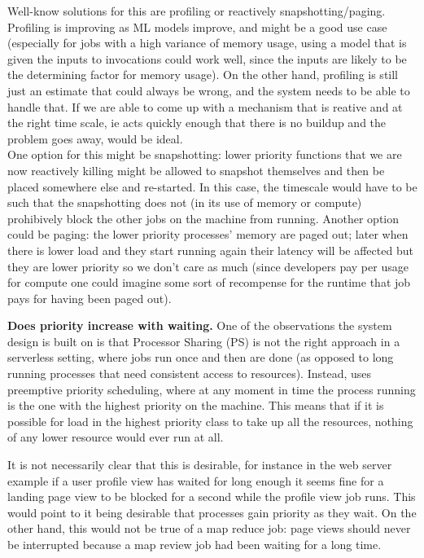 Well-know solutions for this are profiling or reactively snapshotting/paging.
Profiling is improving as ML models improve, and might be a good use case
(especially for jobs with a high variance of memory usage, using a model that is
given the inputs to invocations could work well, since the inputs are likely to
be the determining factor for memory usage). On the other hand, profiling is
still just an estimate that could always be wrong, and the system needs to be
able to handle that. If we are able to come up with a mechanism that is reative
and at the right time scale, ie acts quickly enough that there is no buildup and
the problem goes away, would be ideal. \\
One option for this might be snapshotting: lower priority functions that we are now
reactively killing might be allowed to snapshot themselves and then be placed
somewhere else and re-started. In this case, the timescale would have to be such
that the snapshotting does not (in its use of memory or compute) prohibively
block the other jobs on the machine from running. Another option could be
paging: the lower priority processes' memory are paged out; later when there is
lower load and they start running again their latency will be affected but they
are lower priority so we don't care as much (since developers pay per usage for
compute one could imagine some sort of recompense for the runtime that job pays
for having been paged out).


\textbf{Does priority increase with waiting.}
One of the observations the system design is built on is that Processor Sharing
(PS) is not the right approach in a serverless setting, where jobs run once and
then are done (as opposed to long running processes that need consistent access
to resources). Instead, \sys{} uses preemptive priority scheduling, where
at any moment in time the process running is the one with the highest priority
on the machine. This means that if it is possible for load in the highest
priority class to take up all the resources, nothing of any lower resource would
ever run at all. 

It is not necessarily clear that this is desirable, for instance in the web
server example if a user profile view has waited for long enough it seems fine
for a landing page view to be blocked for a second while the profile view job
runs. This would point to it being desirable that processes gain priority as
they wait. On the other hand, this would not be true of a map reduce job: page
views should never be interrupted because a map review job had been waiting for
a long time.

